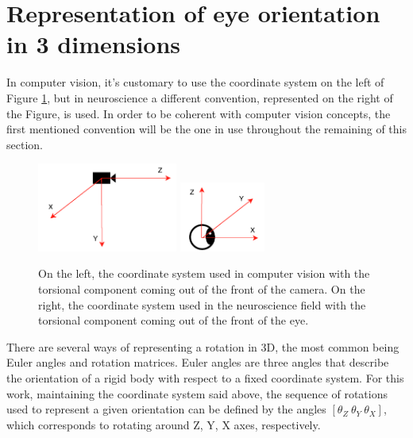 \section{Representation of eye orientation in 3 dimensions}
\label{cha2:represent}
In computer vision, it's customary to use the coordinate system on the left of Figure \ref{cha2:sec2:fig:coordsys2}, but in neuroscience a different convention, represented on the right of the Figure, is used. In order to be coherent with computer vision concepts, the first mentioned convention will be the one in use throughout the remaining of this section.

\begin{figure}[!htb]
	\centering
	\includegraphics[width=0.41\textwidth]{images/cvcoordinatesys.pdf}
	\includegraphics[width=0.25\textwidth]{images/cvcoordinatesysq.pdf}
	\caption[Computer Vision vs Neuroscience coordinate systems]{On the left, the coordinate system used in computer vision with the torsional component coming out of the front of the camera. On the right, the coordinate system used in the neuroscience field with the torsional component coming out of the front of the eye.}
	\label{cha2:sec2:fig:coordsys2}
\end{figure}

There are several ways of representing a rotation in 3D, the most common being Euler angles and rotation matrices. Euler angles are three angles that describe the orientation of a rigid body with respect to a fixed coordinate system. For this work, maintaining the coordinate system said above, the sequence of rotations used to represent a given orientation can be defined by the angles $[\theta_Z \ \theta_Y \ \theta_X]$, which corresponds to rotating around Z, Y, X axes, respectively.


